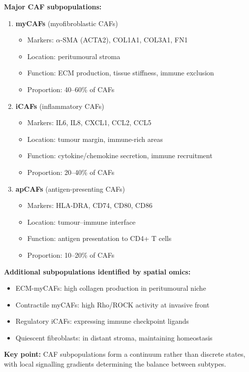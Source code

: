 \begin{tcolorbox}[title=Box 1: CAF subpopulation classification in breast cancer]

\textbf{Major CAF subpopulations:}

\begin{enumerate}
  \item \textbf{myCAFs} (myofibroblastic CAFs)
  \begin{itemize}
    \item Markers: $\alpha$-SMA (ACTA2), COL1A1, COL3A1, FN1
    \item Location: peritumoural stroma
    \item Function: ECM production, tissue stiffness, immune exclusion
    \item Proportion: 40--60\% of CAFs
  \end{itemize}

  \item \textbf{iCAFs} (inflammatory CAFs)
  \begin{itemize}
    \item Markers: IL6, IL8, CXCL1, CCL2, CCL5
    \item Location: tumour margin, immune-rich areas
    \item Function: cytokine/chemokine secretion, immune recruitment
    \item Proportion: 20--40\% of CAFs
  \end{itemize}

  \item \textbf{apCAFs} (antigen-presenting CAFs)
  \begin{itemize}
    \item Markers: HLA-DRA, CD74, CD80, CD86
    \item Location: tumour--immune interface
    \item Function: antigen presentation to CD4+ T cells
    \item Proportion: 10--20\% of CAFs
  \end{itemize}
\end{enumerate}

\textbf{Additional subpopulations identified by spatial omics:}
\begin{itemize}
  \item ECM-myCAFs: high collagen production in peritumoural niche
  \item Contractile myCAFs: high Rho/ROCK activity at invasive front
  \item Regulatory iCAFs: expressing immune checkpoint ligands
  \item Quiescent fibroblasts: in distant stroma, maintaining homeostasis
\end{itemize}

\textbf{Key point:} CAF subpopulations form a continuum rather than discrete states, with local signalling gradients determining the balance between subtypes.

\end{tcolorbox}
